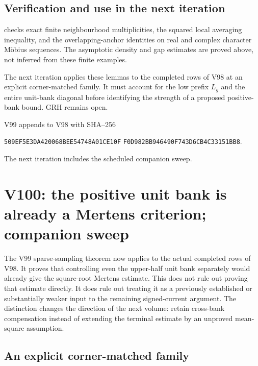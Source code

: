 \documentclass[11pt]{article}
\theoremstyle{definition}
\theoremstyle{remark}
\begin{document}
\subsection*{Verification and use in the next iteration}

 checks exact finite
neighbourhood multiplicities, the squared local averaging inequality,
and the overlapping-anchor identities on real and complex character
M\"obius sequences.  The asymptotic density and gap estimates are
proved above, not inferred from these finite examples.

The next iteration applies these lemmas to the completed rows of V98
at an explicit corner-matched family.  It must account for the low
prefix \(L_g\) and the entire unit-bank diagonal before identifying
the strength of a proposed positive-bank bound.  GRH remains open.

V99 appends to V98 with SHA--256
\begin{center}
\texttt{509EF5E3DA420068BEE54748A01CE10F}\allowbreak
\texttt{F0D982BB946490F743D6CB4C33151BB8}.
\end{center}
The next iteration includes the scheduled companion sweep.
\endgroup

\clearpage
\section{V100: the positive unit bank is already a Mertens criterion; companion sweep}
\label{sec:f2v100-unit-criterion}
\begingroup
\setcounter{equation}{0}
\renewcommand{\theequation}{N100.\arabic{equation}}
\renewcommand{\theHequation}{f2v100.\arabic{equation}}

The V99 sparse-sampling theorem now applies to the actual completed
rows of V98.  It proves that controlling even the upper-half unit
bank separately would already give the square-root Mertens estimate.
This does not rule out proving that estimate directly.  It does rule
out treating it as a previously established or substantially weaker
input to the remaining signed-current argument.  The distinction
changes the direction of the next volume: retain cross-bank compensation
instead of extending the terminal estimate by an unproved mean-square
assumption.

\subsection{An explicit corner-matched family}
\end{document}
